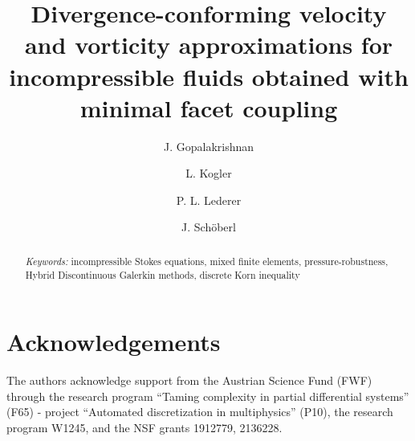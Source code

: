 \documentclass[reqno, 12pt]{amsart}
\theoremstyle{definition}
\begin{document}
\title[$H(\div)$-conforming velocity-vorticity approximations]
{Divergence-conforming velocity and vorticity
approximations for incompressible fluids obtained with minimal facet coupling}

\author
{J. Gopalakrishnan} 
\address{Portland State University, PO Box 751, Portland OR 97207, USA} 

\author
{L. Kogler} 
\address{Institute for Analysis and Scientific Computing, TU Wien\\
Wiedner Hauptstra{\ss}e 8-10, 1040 Wien, Austria} 

\author
{P. L. Lederer} 
\address{Department of Applied Mathematics, University of Twente,
Hallenweg 19, 7522NH  Enschede, Netherlands,} 
 
 \author{J. Sch\"oberl}
 \address{Institute for Analysis and Scientific Computing, TU Wien\\
 Wiedner Hauptstra{\ss}e 8-10, 1040 Wien, Austria}


\begin{abstract}
  {}

\medskip
{{\em Keywords:} incompressible Stokes equations,  mixed finite elements,
pressure-robustness, Hybrid Discontinuous Galerkin methods, discrete
Korn inequality}
\end{abstract}
\maketitle



\section*{Acknowledgements}

\begin{footnotesize}
The authors acknowledge support from the Austrian Science Fund (FWF)
through the research program ``Taming complexity in partial
differential systems'' (F65) - project ``Automated discretization in
multiphysics'' (P10), the research program W1245, and the 
NSF grants 1912779, 2136228.  
\end{footnotesize}




\end{document}
